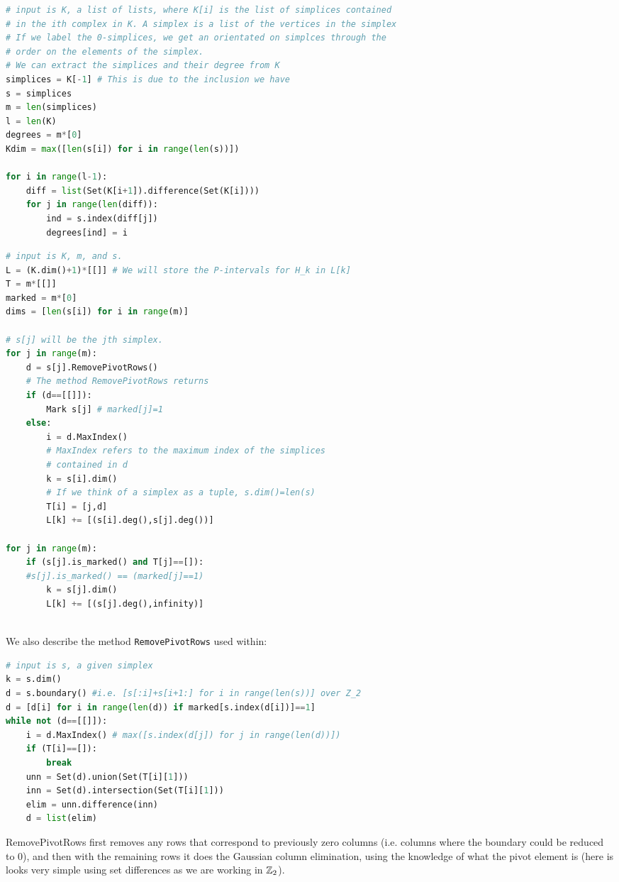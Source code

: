 \documentclass{article}
\begin{document}
\begin{lstlisting}[language=Python,frame=single]
# input is K, a list of lists, where K[i] is the list of simplices contained
# in the ith complex in K. A simplex is a list of the vertices in the simplex
# If we label the 0-simplices, we get an orientated on simplces through the 
# order on the elements of the simplex.
# We can extract the simplices and their degree from K
simplices = K[-1] # This is due to the inclusion we have
s = simplices
m = len(simplices)
l = len(K)
degrees = m*[0]
Kdim = max([len(s[i]) for i in range(len(s))])

for i in range(l-1):
	diff = list(Set(K[i+1]).difference(Set(K[i])))
	for j in range(len(diff)):
		ind = s.index(diff[j])
		degrees[ind] = i
\end{lstlisting}

\begin{lstlisting}[language=Python,frame=single]
# input is K, m, and s. 
L = (K.dim()+1)*[[]] # We will store the P-intervals for H_k in L[k]
T = m*[[]]
marked = m*[0]
dims = [len(s[i]) for i in range(m)]

# s[j] will be the jth simplex. 
for j in range(m):
	d = s[j].RemovePivotRows()
	# The method RemovePivotRows returns 
	if (d==[[]]):
		Mark s[j] # marked[j]=1
	else:
		i = d.MaxIndex()
		# MaxIndex refers to the maximum index of the simplices 
		# contained in d
		k = s[i].dim()
		# If we think of a simplex as a tuple, s.dim()=len(s)
		T[i] = [j,d]
		L[k] += [(s[i].deg(),s[j].deg())]

for j in range(m):
	if (s[j].is_marked() and T[j]==[]): 
	#s[j].is_marked() == (marked[j]==1)
		k = s[j].dim()
		L[k] += [(s[j].deg(),infinity)]
	
\end{lstlisting}
We also describe the method \texttt{RemovePivotRows} used within:
\begin{lstlisting}[language=Python,frame=single]
# input is s, a given simplex
k = s.dim()
d = s.boundary() #i.e. [s[:i]+s[i+1:] for i in range(len(s))] over Z_2
d = [d[i] for i in range(len(d)) if marked[s.index(d[i])]==1]
while not (d==[[]]):
	i = d.MaxIndex() # max([s.index(d[j]) for j in range(len(d))])
	if (T[i]==[]):
		break
	unn = Set(d).union(Set(T[i][1]))
	inn = Set(d).intersection(Set(T[i][1]))
	elim = unn.difference(inn)
	d = list(elim)
\end{lstlisting}
RemovePivotRows first removes any rows that correspond to previously zero columns (i.e. columns where the boundary could be reduced to $0$), and then with the remaining rows it does the Gaussian column elimination, using the knowledge of what the pivot element is (here is looks very simple using set differences as we are working in $\mathbb{Z}_2$).
\end{document}
